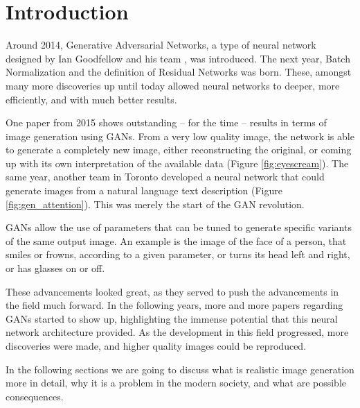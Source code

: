 \section{Introduction}

Around 2014, Generative Adversarial Networks, a type of neural network designed by Ian Goodfellow and his team \cite{goodfellow2014generative}, was introduced. The next year, Batch Normalization \cite{ioffe2015batch} and the definition of Residual Networks \cite{he2015deep} was born. These, amongst many more discoveries up until today allowed neural networks to deeper, more efficiently, and with much better results.

One paper from 2015 \cite{denton2015deep} shows outstanding -- for the time -- results in terms of image generation using GANs. From a very low quality image, the network is able to generate a completely new image, either reconstructing the original, or coming up with its own interpretation of the available data (Figure \ref{fig:eyescream}). The same year, another team in Toronto developed a neural network that could generate images from a natural language text description (Figure \ref{fig:gen_attention}). This was merely the start of the GAN revolution.

GANs allow the use of parameters that can be tuned to generate specific variants of the same output image. An example is the image of the face of a person, that smiles or frowns, according to a given parameter, or turns its head left and right, or has glasses on or off.

These advancements looked great, as they served to push the advancements in the field much forward. In the following years, more and more papers regarding GANs started to show up, highlighting the immense potential that this neural network architecture provided. As the development in this field progressed, more discoveries were made, and higher quality images could be reproduced.

In the following sections we are going to discuss what is realistic image generation more in detail, why it is a problem in the modern society, and what are possible consequences.

